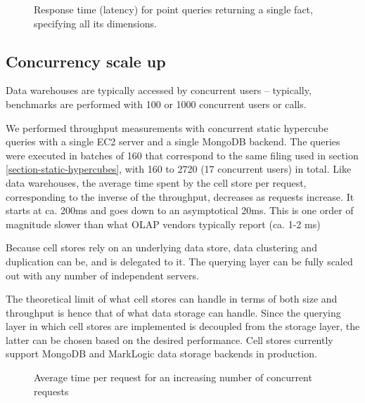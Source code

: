 \documentclass{acm_proc_article-sp}
\begin{document}
\begin{figure}
\caption{Response time (latency) for point queries returning a single fact, specifying all its dimensions.}
\label{figure-dimension-scaleup}
\end{figure}

\subsection{Concurrency scale up}

Data warehouses are typically accessed by concurrent users -- typically, benchmarks are performed with 100 or 1000 concurrent users or calls.

We performed throughput measurements with concurrent static hypercube queries with a single EC2 server and a single MongoDB backend. The queries were executed in batches of 160 that correspond to the same filing used in section \ref{section-static-hypercubes}, with 160 to 2720 (17 concurrent users) in total. Like data warehouses, the average time spent by the cell store per request, corresponding to the inverse of the throughput, decreases as requests increase. It starts at ca. 200ms and goes down to an asymptotical 20ms. This is one order of magnitude slower than what OLAP vendors typically report (ca. 1-2 ms)

Because cell stores rely on an underlying data store, data clustering and duplication can be, and is delegated to it. The querying layer can be fully scaled out with any number of independent servers.
 
 The theoretical limit of what cell stores can handle in terms of both size and throughput is hence that of what data storage can handle. Since the querying layer in which cell stores are implemented is decoupled from the storage layer, the latter can be chosen based on the desired performance. Cell stores currently support MongoDB and MarkLogic data storage backends in production.

\begin{figure}
\caption{Average time per request for an increasing number of concurrent requests}
\label{figure-concurrency}
\end{figure}
\end{document}
